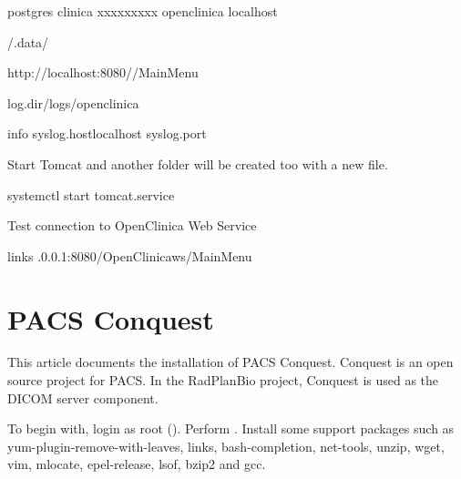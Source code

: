 \documentclass[letterpaper,10pt,english]{sphinxmanual}
\begin{document}
%
\begin{sphinxVerbatim}[commandchars=\\\{\}]
postgres
clinica
xxxxxxxxx
openclinica
localhost

/.data/

http://localhost:8080//MainMenu

log.dir/logs/openclinica

info
syslog.hostlocalhost
syslog.port
\end{sphinxVerbatim}

Start Tomcat and another folder will be created too with a new  file.

%
\begin{sphinxVerbatim}[commandchars=\\\{\}]
systemctl start tomcat.service
\end{sphinxVerbatim}

Test connection to OpenClinica Web Service

%
\begin{sphinxVerbatim}[commandchars=\\\{\}]
links .0.0.1:8080/OpenClinica\PYGZhy{}ws/MainMenu
\end{sphinxVerbatim}


\chapter{PACS Conquest}
\label{\detokenize{trl2:pacs-conquest}}\label{\detokenize{trl2::doc}}
This article documents the installation of PACS Conquest. Conquest is an open source project for PACS. In the RadPlanBio project, Conquest is used as the DICOM server component.

To begin with, login as root (). Perform . Install some support packages such as yum-plugin-remove-with-leaves, links, bash-completion, net-tools, unzip, wget, vim, mlocate, epel-release, lsof, bzip2 and gcc.
\end{document}

